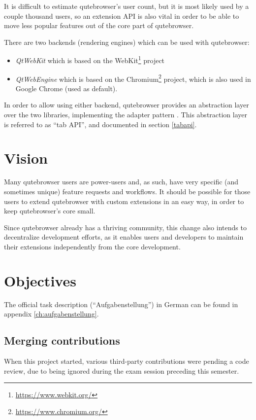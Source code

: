 It is difficult to estimate qutebrowser's user count, but it is most likely used by a
couple thousand users, so an extension API is also vital in order to be able to move
less popular features out of the core part of qutebrowser.

\label{backends}
There are two backends (rendering engines) which can be used with qutebrowser:

\begin{itemize}
  \item \emph{QtWebKit} which is based on the
  WebKit\footnote{\url{https://www.webkit.org/}} project
  \item \emph{QtWebEngine} which is based on the
  Chromium\footnote{\url{https://www.chromium.org/}} project, which is also used
  in Google Chrome (used as default).
\end{itemize}

In order to allow using either backend, qutebrowser provides an abstraction
layer over the two libraries, implementing the adapter pattern
\autocite[139ff]{gof}. This abstraction layer is referred to as ``tab API'', and
documented in section \ref{tabapi}.

\section{Vision}
\label{vision}

Many qutebrowser users are power-users and, as such, have very specific (and
sometimes unique) feature requests and workflows. It should be possible for
those users to extend qutebrowser with custom extensions in an easy way, in order
to keep qutebrowser's core small.

Since qutebrowser already has a thriving community, this change also intends to
decentralize development efforts, as it enables users and developers to maintain
their extensions independently from the core development.

\section{Objectives}
\label{goals}

The official task description (``Aufgabenstellung'') in German can be found in
appendix \ref{ch:aufgabenstellung}.

\subsection{Merging contributions}
When this project started, various third-party contributions were pending a code
review, due to being ignored during the exam session preceding this semester.

